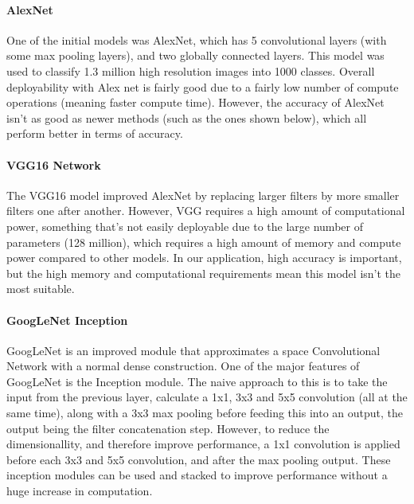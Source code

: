 \documentclass[11pt,a4paper]{article}
\begin{document}
        \paragraph{AlexNet} 
        One of the initial models was AlexNet, which has 5 convolutional layers (with some max pooling layers), and two globally connected layers.
        This model was used to classify 1.3 million high resolution images into 1000 classes. \cite{AlexNet} Overall deployability
        with Alex net is fairly good due to a fairly low number of compute operations (meaning faster compute time). \cite{DeepNeuralNetworkDeployability} However, the accuracy of AlexNet isn't
        as good as newer methods (such as the ones shown below), which all perform better in terms of accuracy. 
        
        \paragraph{VGG16 Network}
        The VGG16 model improved AlexNet by replacing larger filters by more smaller filters one after another.
        However, VGG requires a high amount of computational power, something that's not easily deployable due to
        the large number of parameters (128 million), which requires a high amount of memory and compute power compared
        to other models. \cite{DeepNeuralNetworkDeployability} In our application, high accuracy is important, but the high
        memory and computational requirements mean this model isn't the most suitable.

        \paragraph{GoogLeNet Inception}
        GoogLeNet is an improved module that approximates a space Convolutional Network with a normal
        dense construction. One of the major features of GoogLeNet is the Inception module. The naive approach to this 
        is to take the input from the previous layer, calculate a 1x1, 3x3 and 5x5 convolution (all at the same time), along with
        a 3x3 max pooling before feeding this into an output, the output being the filter concatenation step.
        However, to reduce the dimensionallity, and therefore improve performance, a 1x1 convolution is applied before
        each 3x3 and 5x5 convolution, and after the max pooling output. These inception modules can be used and stacked
        to improve performance without a huge increase in computation. \cite{GoogLeNet} 
 
\end{document}
